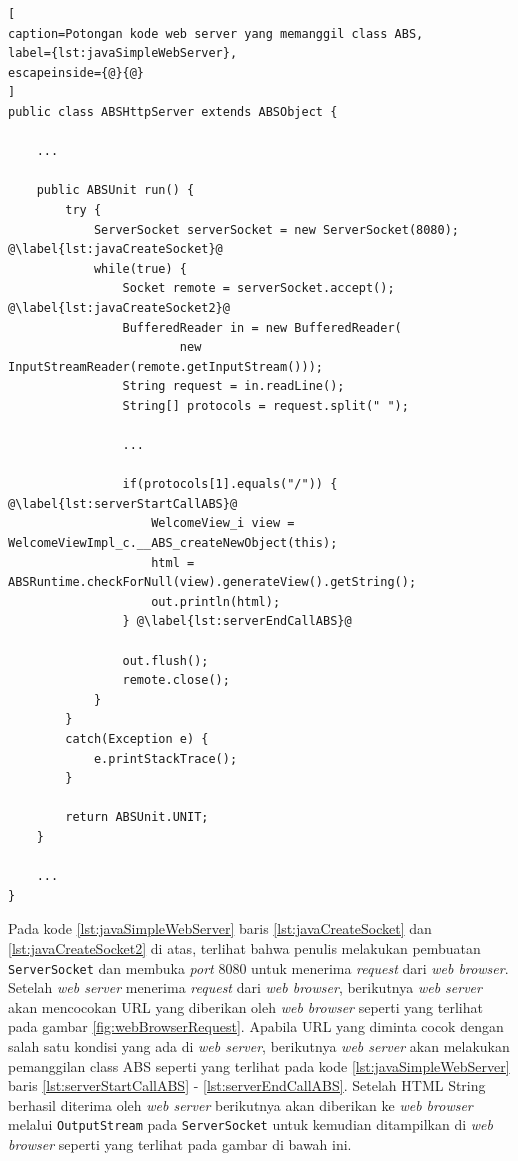 \begin{lstlisting}[
caption=Potongan kode web server yang memanggil class ABS,
label={lst:javaSimpleWebServer},
escapeinside={@}{@}
]
public class ABSHttpServer extends ABSObject {

    ...
    
    public ABSUnit run() {
        try {
            ServerSocket serverSocket = new ServerSocket(8080); @\label{lst:javaCreateSocket}@
            while(true) {
                Socket remote = serverSocket.accept(); @\label{lst:javaCreateSocket2}@
                BufferedReader in = new BufferedReader(
                        new InputStreamReader(remote.getInputStream()));
                String request = in.readLine();
                String[] protocols = request.split(" ");
                
                ...
                
                if(protocols[1].equals("/")) { @\label{lst:serverStartCallABS}@
                	WelcomeView_i view = WelcomeViewImpl_c.__ABS_createNewObject(this); 
                    html = ABSRuntime.checkForNull(view).generateView().getString();
                    out.println(html);
                } @\label{lst:serverEndCallABS}@
                
                out.flush();
                remote.close();
            }
        }
        catch(Exception e) {
            e.printStackTrace();
        }
        
        return ABSUnit.UNIT;
    }
    
    ...
}
\end{lstlisting}

Pada kode \ref{lst:javaSimpleWebServer} baris \ref{lst:javaCreateSocket} dan \ref{lst:javaCreateSocket2} di atas, terlihat bahwa penulis melakukan pembuatan \texttt{ServerSocket} dan membuka \textit{port} 8080 untuk menerima \textit{request} dari \textit{web browser}. Setelah \textit{web server} menerima \textit{request} dari \textit{web browser}, berikutnya \textit{web server} akan mencocokan URL yang diberikan oleh \textit{web browser} seperti yang terlihat pada gambar \ref{fig:webBrowserRequest}. Apabila URL yang diminta cocok dengan salah satu kondisi yang ada di \textit{web server}, berikutnya \textit{web server} akan melakukan pemanggilan class ABS seperti yang terlihat pada kode \ref{lst:javaSimpleWebServer} baris \ref{lst:serverStartCallABS} - \ref{lst:serverEndCallABS}. Setelah HTML String berhasil diterima oleh \textit{web server} berikutnya akan diberikan ke \textit{web browser} melalui \texttt{OutputStream} pada \texttt{ServerSocket} untuk kemudian ditampilkan di \textit{web browser} seperti yang terlihat pada gambar di bawah ini.


